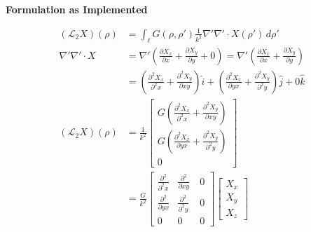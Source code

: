 \documentclass{article}
\newcommand{\0}{\varnothing}
\begin{document}
\begin{minipage}{0.45\textwidth}
\ \\
\begin{center}  \bf Formulation as Implemented\end{center}
\begin{align*}
    (\mathcal{L}_2X)(\rho) &= \int_{\ell}G(\rho,\rho')\frac{1}{k^2}\nabla'\nabla'\cdotp X(\rho') \,d\rho'\\
    \nabla'\nabla'\cdotp X &= \nabla' (\frac{\partial X_x}{\partial x} + \frac{\partial X_y}{\partial y} + 0) 
    = \nabla' \left( \frac{\partial X_x}{\partial x} + \frac{\partial X_y}{\partial y} \right)\\
    &= \left( \frac{\partial^2 X_x}{\partial^2 x} + \frac{\partial^2 X_y}{\partial xy}\right) \hat i + 
    \left( \frac{\partial^2 X_x}{\partial yx} + \frac{\partial^2 X_y}{\partial^2 y}\right) \hat j + 
        0 \hat k\\
    (\mathcal{L}_2X)(\rho) &= \frac{1}{k^2}
    \left[ \begin{array}{c} G\left( \frac{\partial^2 X_x}{\partial^2 x} + \frac{\partial^2 X_y}{\partial xy}\right) \\ 
                            G\left( \frac{\partial^2 X_x}{\partial yx} + \frac{\partial^2 X_y}{\partial^2 y}\right)\\ 
                            0 
    \end{array} \right] \\ 
    &= \frac{G}{k^2} \left[ \begin{array}{ccc} \frac{\partial^2 }{\partial^2 x} & \frac{\partial^2 }{\partial xy}\ & 0 \\ 
                            \frac{\partial^2 }{\partial yx} & \frac{\partial^2 }{\partial^2 y} &0\\ 
                            0 & 0 &0 \end{array} \right]
        \left[ \begin{array}{c} 
        X_x \\ X_y \\ X_z \end{array} \right]
\end{align*}
\end{minipage}
\end{document}
